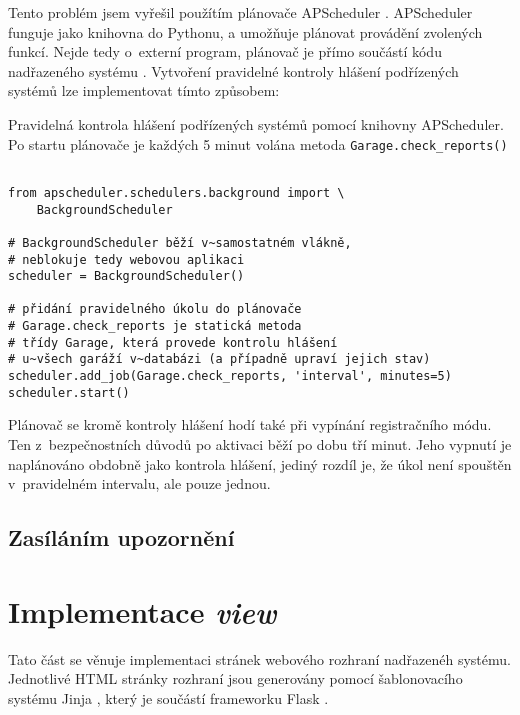 Tento problém jsem vyřešil použítím plánovače APScheduler \cite{apscheduler}. APScheduler funguje jako knihovna do Pythonu, a umožňuje plánovat provádění zvolených funkcí. Nejde tedy o~externí program, plánovač je přímo součástí kódu nadřazeného systému \cite{apscheduler}. Vytvoření pravidelné kontroly hlášení podřízených systémů lze implementovat tímto způsobem:

\begin{listing}[htbp]
\caption{\label{lst:scheduler_check} Pravidelná kontrola hlášení podřízených systémů pomocí knihovny APScheduler. Po startu plánovače je každých 5 minut volána metoda \texttt{Garage.check\_reports()}}
\begin{verbatim}

from apscheduler.schedulers.background import \
    BackgroundScheduler

# BackgroundScheduler běží v~samostatném vlákně,
# neblokuje tedy webovou aplikaci
scheduler = BackgroundScheduler()

# přidání pravidelného úkolu do plánovače
# Garage.check_reports je statická metoda
# třídy Garage, která provede kontrolu hlášení
# u~všech garáží v~databázi (a případně upraví jejich stav)
scheduler.add_job(Garage.check_reports, 'interval', minutes=5)
scheduler.start()
\end{verbatim}
\end{listing}

Plánovač se kromě kontroly hlášení hodí také při vypínání registračního módu. Ten z~bezpečnostních důvodů po aktivaci běží po dobu tří minut. Jeho vypnutí je naplánováno obdobně jako kontrola hlášení, jediný rozdíl je, že úkol není spouštěn v~pravidelném intervalu, ale pouze jednou.

\subsection{Zasíláním upozornění}



\section{Implementace \textit{view}}

Tato část se věnuje implementaci stránek webového rozhraní nadřazenéh systému. Jednotlivé HTML stránky rozhraní jsou generovány pomocí šablonovacího systému Jinja \cite{jinja}, který je součástí frameworku Flask \cite{flask_templates}. 


